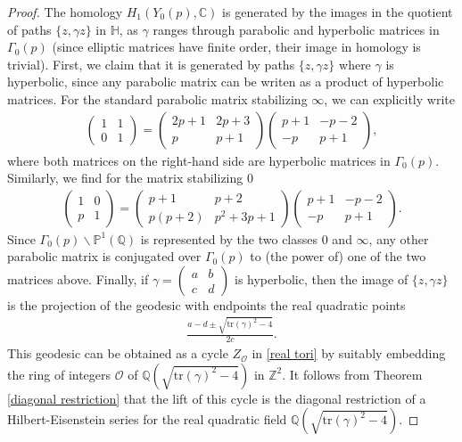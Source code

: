 \documentclass[a4paper,11pt]{amsart} %
\newcommand{\8}{\infty}
\newcommand{\Z}{\mathbb{Z}}
\newcommand{\HH}{\mathbb{H}}
\newcommand{\Q}{\mathbb{Q}}
\newcommand{\C}{\mathbb{C}}
\newcommand{\PP}{\mathbb{P}}
\newcommand{\tr}{\mathrm{tr}}
\newcommand{\Ocal}{\mathcal{O}}
\theoremstyle{mytheoremstyle}
\theoremstyle{remark}
\numberwithin{equation}{section}
\begin{document}
\begin{proof} The homology $H_1(Y_0(p),\C)$ is generated by the images in the quotient of paths $\{z, \gamma z\}$ in $\HH$, as $\gamma$ ranges through parabolic and hyperbolic matrices in $\Gamma_0(p)$ (since elliptic matrices have finite order, their image in homology is trivial). First, we claim that it is generated by paths $\{z, \gamma z\}$ where $\gamma$ is hyperbolic, since any parabolic matrix can be writen as a product of hyperbolic matrices. For the standard parabolic matrix stabilizing $\8$, we can explicitly write
\begin{align}
\begin{pmatrix}
1 & 1 \\ 0 & 1
\end{pmatrix}=\begin{pmatrix}
2p+1 & 2p+3 \\ p & p+1
\end{pmatrix}\begin{pmatrix}
p+1 & -p-2 \\ -p & p+1
\end{pmatrix},
\end{align}
where both matrices on the right-hand side are hyperbolic matrices in $\Gamma_0(p)$. Similarly, we find for the matrix stabilizing $0$
\begin{align}
\begin{pmatrix}
1 & 0 \\ p & 1
\end{pmatrix}=\begin{pmatrix}
p+1 & p+2 \\ p(p+2)& p^2+3p+1
\end{pmatrix}\begin{pmatrix}
p+1 & -p-2 \\ -p & p+1
\end{pmatrix}.
\end{align}
Since $\Gamma_0(p)\backslash \PP^1(\Q)$ is represented by the two classes $0$ and $\8$, any other parabolic matrix is conjugated over $\Gamma_0(p)$ to (the power of) one of the two matrices above. 
Finally, if $\gamma=\begin{pmatrix}
a & b \\ c & d
\end{pmatrix}$ is hyperbolic, then the image of $\{z, \gamma z\}$ is the projection of the geodesic with endpoints the real quadratic points
\begin{align}
\frac{a-d \pm \sqrt{\tr(\gamma)^2-4}}{2c}.
\end{align}
This geodesic can be obtained as a cycle $Z_\Ocal$ in \ref{real tori} by suitably embedding the ring of integers $\Ocal$ of $\Q(\sqrt{\tr(\gamma)^2-4})$ in $\Z^2$. It follows from Theorem \ref{diagonal restriction} that the lift of this cycle is the diagonal restriction of a Hilbert-Eisenstein series for the real quadratic field $\Q(\sqrt{\tr(\gamma)^2-4})$.
\end{proof}

\printbibliography
\end{document}
